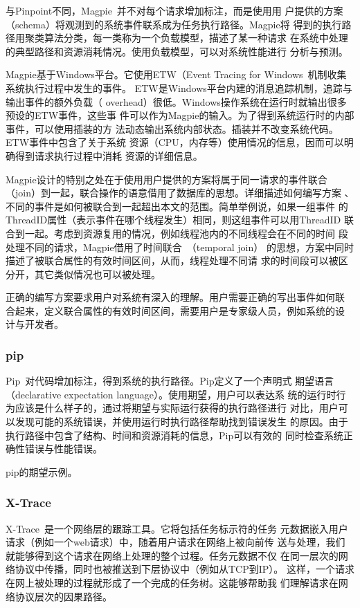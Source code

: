 与Pinpoint不同，Magpie~\cite{magpie}并不对每个请求增加标注，而是使用用
户提供的方案（schema）将观测到的系统事件联系成为任务执行路径。Magpie将
得到的执行路径用聚类算法分类，每一类称为一个负载模型，描述了某一种请求
在系统中处理的典型路径和资源消耗情况。使用负载模型，可以对系统性能进行
分析与预测。

Magpie基于Windows平台。它使用ETW（Event Tracing for
Windows~\cite{magpieref17, ref18}机制收集系统执行过程中发生的事件。
ETW是Windows平台内建的消息追踪机制，追踪与输出事件的额外负载（
overhead）很低。Windows操作系统在运行时就输出很多预设的ETW事件，这些事
件可以作为Magpie的输入。为了得到系统运行时的内部事件，可以使用插装的方
法动态输出系统内部状态。插装并不改变系统代码。ETW事件中包含了关于系统
资源（CPU，内存等）使用情况的信息，因而可以明确得到请求执行过程中消耗
资源的详细信息。

Magpie设计的特别之处在于使用用户提供的方案将属于同一请求的事件联合
（join）到一起，联合操作的语意借用了数据库的思想。详细描述如何编写方案
、不同的事件是如何被联合到一起超出本文的范围。简单举例说，如果一组事件
的ThreadID属性（表示事件在哪个线程发生）相同，则这组事件可以用ThreadID
联合到一起。考虑到资源复用的情况，例如线程池内的不同线程会在不同的时间
段处理不同的请求，Magpie借用了时间联合~\cite{magpie10}（temporal join）
的思想，方案中同时描述了被联合属性的有效时间区间，从而，线程处理不同请
求的时间段可以被区分开，其它类似情况也可以被处理。

正确的编写方案要求用户对系统有深入的理解。用户需要正确的写出事件如何联
合起来，定义联合属性的有效时间区间，需要用户是专家级人员，例如系统的设
计与开发者。

\subsubsection*{pip}

Pip~\cite{pip}对代码增加标注，得到系统的执行路径。Pip定义了一个声明式
期望语言（declarative expectation language）。使用期望，用户可以表达系
统的运行时行为应该是什么样子的，通过将期望与实际运行获得的执行路径进行
对比，用户可以发现可能的系统错误，并使用运行时执行路径帮助找到错误发生
的原因。由于执行路径中包含了结构、时间和资源消耗的信息，Pip可以有效的
同时检查系统正确性错误与性能错误。

pip的期望示例。

\subsubsection*{X-Trace}

X-Trace~\cite{x-trace}是一个网络层的跟踪工具。它将包括任务标示符的任务
元数据嵌入用户请求（例如一个web请求）中，随着用户请求在网络上被向前传
送与处理，我们就能够得到这个请求在网络上处理的整个过程。任务元数据不仅
在同一层次的网络协议中传播，同时也被推送到下层协议中（例如从TCP到IP）。
这样，一个请求在网上被处理的过程就形成了一个完成的任务树。这能够帮助我
们理解请求在网络协议层次的因果路径。

